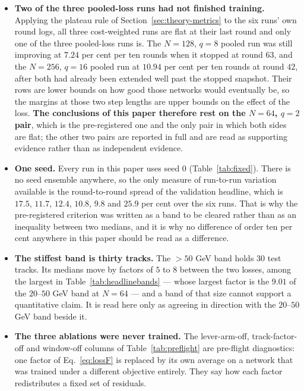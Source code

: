 \documentclass[11pt,a4paper]{article}
\begin{document}
\begin{itemize}
  \item \textbf{Two of the three pooled-loss runs had not finished training.}
  Applying the plateau rule of Section~\ref{sec:theory-metrics} to the six
  runs' own round logs, all three cost-weighted runs are flat at their last
  round and only one of the three pooled-loss runs is. The $N = 128$, $q = 8$
  pooled run was still improving at $7.24$ per cent per ten rounds when it
  stopped at round $63$, and the $N = 256$, $q = 16$ pooled run at $10.94$ per
  cent per ten rounds at round $42$, after both had already been extended well
  past the stopped snapshot. Their rows are lower bounds on how good those
  networks would eventually be, so the margins at those two step lengths are
  upper bounds on the effect of the loss. \textbf{The conclusions of this paper
  therefore rest on the $N = 64$, $q = 2$ pair}, which is the pre-registered one
  and the only pair in which both sides are flat; the other two pairs are
  reported in full and are read as supporting evidence rather than as
  independent evidence.
  \item \textbf{One seed.} Every run in this paper uses seed $0$
  (Table~\ref{tab:fixed}). There is no seed ensemble anywhere, so the only
  measure of run-to-run variation available is the round-to-round spread of the
  validation headline, which is $17.5$, $11.7$, $12.4$, $10.8$, $9.8$ and
  $25.9$ per cent over the six runs. That is why the pre-registered criterion
  was written as a band to be cleared rather than as an inequality between two
  medians, and it is why no difference of order ten per cent anywhere in this
  paper should be read as a difference.
  \item \textbf{The stiffest band is thirty tracks.} The $>50$ GeV band holds
  $30$ test tracks. Its medians move by factors of $5$ to $8$ between the two
  losses, among the largest in Table~\ref{tab:headlinebands} --- whose largest
  factor is the $9.01$ of the $20$--$50$ GeV band at $N = 64$ --- and a
  band of that size cannot support a quantitative claim. It is read here only as
  agreeing in direction with the $20$--$50$ GeV band beside it.
  \item \textbf{The three ablations were never trained.} The lever-arm-off,
  track-factor-off and window-off columns of Table~\ref{tab:preflight} are
  pre-flight diagnostics: one factor of Eq.~\eqref{eq:lossF} is replaced by its
  own average on a network that was trained under a different objective
  entirely. They say how each factor redistributes a fixed set of residuals.

\end{itemize}
\end{document}
